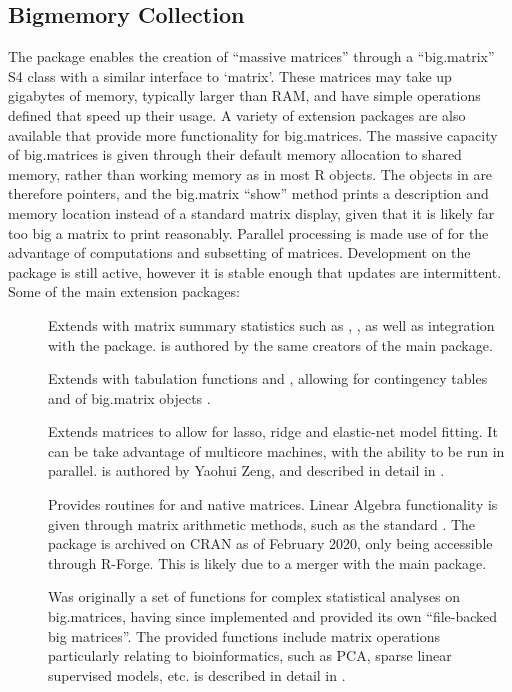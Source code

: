 \subsection{Bigmemory Collection}\label{subsec:bigmemory-collection}

The  package enables the creation of ``massive matrices'' through a ``big.matrix'' S4 class with a similar interface to `matrix'\cite{kane13:bigmemory}.
These matrices may take up gigabytes of memory, typically larger than RAM, and have simple operations defined that speed up their usage.
A variety of extension packages are also available that provide more functionality for big.matrices.
The massive capacity of big.matrices is given through their default memory allocation to shared memory, rather than working memory as in most R objects.
The objects in \R{} are therefore pointers, and the big.matrix ``show'' method prints a description and memory location instead of a standard matrix display, given that it is likely far too big a matrix to print reasonably.
Parallel processing is made use of for the advantage of computations and subsetting of matrices.
Development on the package is still active, however it is stable enough that updates are intermittent.
Some of the main extension packages:

\begin{description} \item[] Extends  with matrix summary statistics such as , , as well as integration with the  package\cite{emerson16}.
		 is authored by the same creators
		of the main  package.
	\item[]
		Extends  with tabulation functions and ,
		allowing for contingency tables and  of big.matrix
		objects \cite{kane16}.
	\item[]
		Extends  matrices to allow for lasso, ridge and elastic-net
		model fitting.
		It can be take advantage of multicore machines, with the ability to be run in parallel.
		 is authored by Yaohui Zeng, and
		described in detail in \textcite{zeng2017biglasso}.
	\item[]
		Provides  routines for  and native \R{} matrices.
		Linear Algebra functionality is given through matrix arithmetic methods, such as the standard .
		The package is archived on CRAN as of February 2020, only being accessible through R-Forge.
		This is likely due to a merger with the main  package.
	\item[]
		Was originally a set of functions for complex statistical analyses on
		big.matrices, having since implemented and provided its own
		``file-backed big matrices''\cite{prive2018efficient}.
		The provided functions include matrix operations particularly relating to bioinformatics, such as PCA, sparse linear supervised models, etc.  is described in detail in \textcite{prive2018efficient}.
\end{description}


